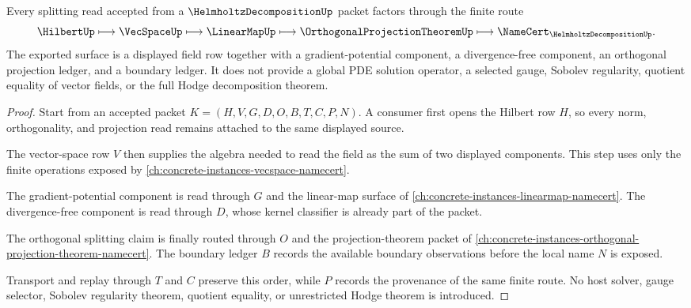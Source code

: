 \begin{theorem}
\label{thm:helmholtz-decomposition-orthogonal-splitting-route}
Every splitting read accepted from a $\HelmholtzDecompositionUp$ packet factors through the finite route
$$
\HilbertUp
\longmapsto
\VecSpaceUp
\longmapsto
\LinearMapUp
\longmapsto
\OrthogonalProjectionTheoremUp
\longmapsto
\NameCert_{\HelmholtzDecompositionUp}.
$$
The exported surface is a displayed field row together with a gradient-potential component, a divergence-free component, an orthogonal projection ledger, and a boundary ledger. It does not provide a global PDE solution operator, a selected gauge, Sobolev regularity, quotient equality of vector fields, or the full Hodge decomposition theorem.
\end{theorem}
\begin{proof}
Start from an accepted packet $K=(H,V,G,D,O,B,T,C,P,N)$. A consumer first opens the Hilbert row $H$, so every norm, orthogonality, and projection read remains attached to the same displayed source.

The vector-space row $V$ then supplies the algebra needed to read the field as the sum of two displayed components. This step uses only the finite operations exposed by \autoref{ch:concrete-instances-vecspace-namecert}.

The gradient-potential component is read through $G$ and the linear-map surface of \autoref{ch:concrete-instances-linearmap-namecert}. The divergence-free component is read through $D$, whose kernel classifier is already part of the packet.

The orthogonal splitting claim is finally routed through $O$ and the projection-theorem packet of \autoref{ch:concrete-instances-orthogonal-projection-theorem-namecert}. The boundary ledger $B$ records the available boundary observations before the local name $N$ is exposed.

Transport and replay through $T$ and $C$ preserve this order, while $P$ records the provenance of the same finite route. No host solver, gauge selector, Sobolev regularity theorem, quotient equality, or unrestricted Hodge theorem is introduced.
\end{proof}


